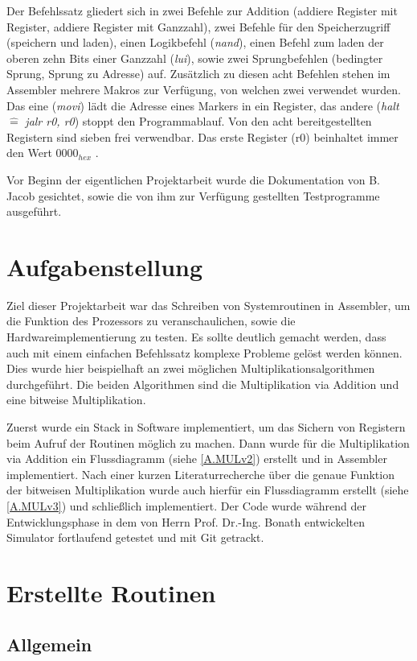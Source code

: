 \documentclass[fleqn, a4paper, 11pt]{article}       %
\begin{document}
Der Befehlssatz gliedert sich in zwei Befehle zur Addition (addiere Register mit Register, addiere Register mit Ganzzahl), zwei Befehle für den Speicherzugriff (speichern und laden), einen Logikbefehl (\emph{nand}), einen Befehl zum laden der oberen zehn Bits einer Ganzzahl (\emph{lui}), sowie zwei Sprungbefehlen (bedingter Sprung, Sprung zu Adresse) auf. Zusätzlich zu diesen acht Befehlen stehen im Assembler mehrere Makros zur Verfügung, von welchen zwei verwendet wurden. Das eine (\emph{movi}) lädt die Adresse eines Markers in ein Register, das andere (\emph{halt} $\widehat{=}$ \emph{jalr r0, r0}) stoppt den Programmablauf. Von den acht bereitgestellten Registern sind sieben frei verwendbar. Das erste Register (r0) beinhaltet immer den Wert $0000_{hex}$ \cite[1]{JACOBInstr}.

Vor Beginn der eigentlichen Projektarbeit wurde die Dokumentation von B. Jacob gesichtet, sowie die von ihm zur Verfügung gestellten Testprogramme ausgeführt.


\section{Aufgabenstellung}
Ziel dieser Projektarbeit war das Schreiben von Systemroutinen in Assembler, um die Funktion des Prozessors zu veranschaulichen, sowie die Hardwareimplementierung zu testen. Es sollte deutlich gemacht werden, dass auch mit einem einfachen Befehlssatz komplexe Probleme gelöst werden können. Dies wurde hier beispielhaft an zwei möglichen Multiplikationsalgorithmen durchgeführt. Die beiden Algorithmen sind die Multiplikation via Addition und eine bitweise Multiplikation. 

Zuerst wurde ein Stack in Software implementiert, um das Sichern von Registern beim Aufruf der Routinen möglich zu machen. Dann wurde für die Multiplikation via Addition ein Flussdiagramm (siehe \ref{A.MULv2}) erstellt und in Assembler implementiert. Nach einer kurzen Literaturrecherche über die genaue Funktion der bitweisen Multiplikation wurde auch hierfür ein Flussdiagramm erstellt (siehe \ref{A.MULv3}) und schließlich implementiert. Der Code wurde während der Entwicklungsphase in dem von Herrn Prof. Dr.-Ing. Bonath entwickelten Simulator fortlaufend getestet und mit Git getrackt.

\section{Erstellte Routinen}
\subsection{Allgemein}
\end{document}
